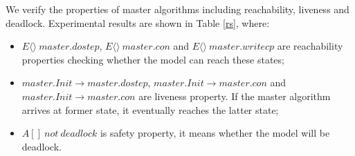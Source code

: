 \begin{figure}[htbp]
\end{figure}


 
We verify the properties of master algorithms including reachability, liveness and deadlock. Experimental results are shown in Table \ref{rs}, where:

\begin{itemize}
\item
$E\langle\rangle~master.dostep$, $E\langle\rangle~master.con$ and $E\langle\rangle~master.writecp$ are reachability properties checking whether the model can reach these states;
\item
$master.Init \rightarrow master.dostep$, $master.Init \rightarrow master.con$ and $master.Init \rightarrow master.con$ are liveness property. If the master algorithm arrives at former state, it eventually reaches the latter state;
\item
$A[]~not~deadlock$ is safety property, it means whether the model will be deadlock.
\end{itemize}

